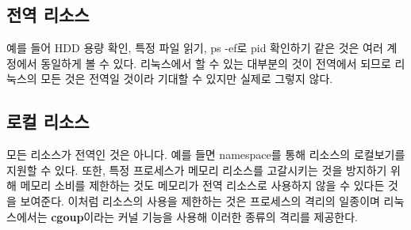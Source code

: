 \subsection*{전역 리소스}
예를 들어 HDD 용량 확인, 특정 파일 읽기, ps -ef로 pid 확인하기 같은 것은 여러 계정에서 동일하게 볼 수 있다.
\newline
리눅스에서 할 수 있는 대부분의 것이 전역에서 되므로 리눅스의 모든 것은 전역일 것이라 기대할 수 있지만 
실제로 그렇지 않다.


\subsection*{로컬 리소스}
모든 리소스가 전역인 것은 아니다. 예를 들면 namespace를 통해 리소스의 로컬보기를 지원할 수 있다.
또한, 특정 프로세스가 메모리 리소스를 고갈시키는 것을 방지하기 위해 
메모리 소비를 제한하는 것도 메모리가 전역 리소스로 사용하지 않을 수 있다든 것을 보여준다.\newline
이처럼 리소스의 사용을 제한하는 것은 프로세스의 격리의 일종이며 
리눅스에서는 \textbf{cgoup}이라는 커널 기능을 사용해 이러한 종류의 격리를 제공한다.\newline

